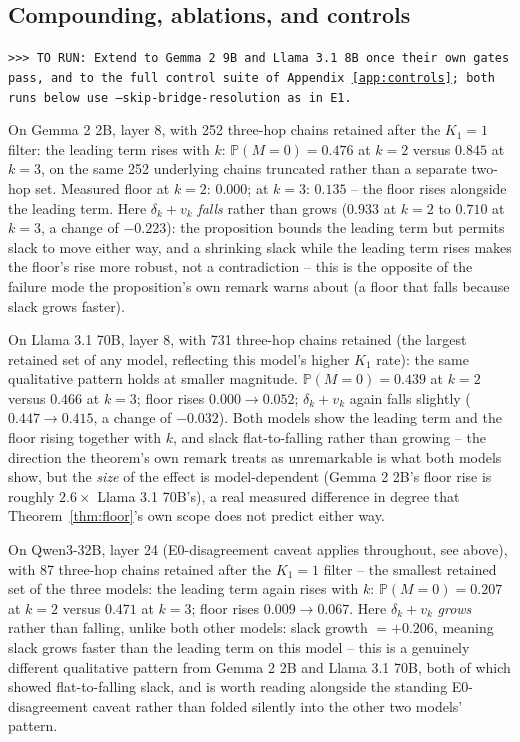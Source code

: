 \documentclass{article}
\newcommand{\TORUN}[1]{{\color{blue}\texttt{>{}>{}> TO RUN: #1}}}
\begin{document}
\subsection{Compounding, ablations, and controls}

\TORUN{Extend to Gemma 2 9B and Llama 3.1 8B once their own gates pass, and to the full control suite
of Appendix~\ref{app:controls}; both runs below use \texttt{--skip-bridge-resolution} as in E1.}

On Gemma 2 2B, layer 8, with 252 three-hop chains retained after the $K_1{=}1$ filter: the leading
term rises with $k$: $\mathbb{P}(M{=}0)=0.476$ at $k{=}2$ versus $0.845$ at $k{=}3$, on
the same 252 underlying chains truncated rather than a separate two-hop set. Measured floor at
$k=2$: $0.000$; at $k=3$: $0.135$ -- the floor rises alongside the leading term. Here $\delta_k+v_k$
\emph{falls} rather than grows ($0.933$ at $k{=}2$ to $0.710$ at $k{=}3$, a change of $-0.223$): the
proposition bounds the leading term but permits slack to move either way, and a shrinking slack while
the leading term rises makes the floor's rise more robust, not a contradiction -- this is the
opposite of the failure mode the proposition's own remark warns about (a floor that falls because
slack grows faster).

On Llama 3.1 70B, layer 8, with 731 three-hop chains retained (the largest retained set of any model,
reflecting this model's higher $K_1$ rate): the same qualitative pattern holds at smaller magnitude.
$\mathbb{P}(M{=}0)=0.439$ at $k{=}2$ versus $0.466$ at $k{=}3$; floor rises $0.000\to0.052$;
$\delta_k+v_k$ again falls slightly ($0.447\to0.415$, a change of $-0.032$). Both models show the
leading term and the floor rising together with $k$, and slack flat-to-falling rather than growing --
the direction the theorem's own remark treats as unremarkable is what both models show, but the
\emph{size} of the effect is model-dependent (Gemma 2 2B's floor rise is roughly $2.6\times$ Llama
3.1 70B's), a real measured difference in degree that Theorem~\ref{thm:floor}'s own scope does not
predict either way.

On Qwen3-32B, layer 24 (E0-disagreement caveat applies throughout, see above), with 87 three-hop
chains retained after the $K_1{=}1$ filter -- the smallest retained set of the three models: the
leading term again rises with $k$: $\mathbb{P}(M{=}0)=0.207$ at $k{=}2$ versus $0.471$ at $k{=}3$;
floor rises $0.009\to0.067$. Here $\delta_k+v_k$ \emph{grows} rather than falling, unlike both other
models: slack growth $=+0.206$, meaning slack grows faster than the leading term on this model --
this is a genuinely different qualitative pattern from Gemma 2 2B and Llama 3.1 70B, both of which
showed flat-to-falling slack, and is worth reading alongside the standing E0-disagreement caveat
rather than folded silently into the other two models' pattern.
\end{document}
